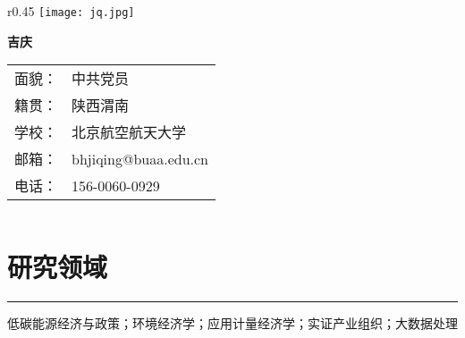 \documentclass[letterpaper]{article}
\def\name{吉庆}
\renewenvironment{itemize}{
  \begin{list}{}{
    \setlength{\leftmargin}{0.2in}
    \setlength{\itemsep}{0.15in}
    \setlength{\parskip}{0.05in}
    \setlength{\parsep}{0.05in}
  }
}{
  \end{list}
}
\begin{document}
\begin{wrapfigure}{r}{0.45\textwidth}
  \vspace*{-0.1cm}
    \centering
      \texttt{[image: jq.jpg]}
	\vspace{-6cm}
\end{wrapfigure}

{\huge \bf \name}
\bigskip

\begin{minipage}[t]{0.4\linewidth}
  \centering
    \begin{tabular}{rl}
      面貌：& 中共党员 \\
      籍贯：& 陕西渭南 \\
      学校：& 北京航空航天大学 \\
      邮箱：& bhjiqing@buaa.edu.cn \\
      电话：& 156-0060-0929 \\
    \end{tabular}
\end{minipage}
\begin{minipage}[t]{0.45\linewidth}
  \centering
    \begin{tabular}{ll}
    \end{tabular}
\end{minipage}

\section*{研究领域}
\hrule
\vspace{0.25cm}
  \begin{itemize}
    \item 低碳能源经济与政策；环境经济学；应用计量经济学；实证产业组织；大数据处理
  \end{itemize}
\end{document}

